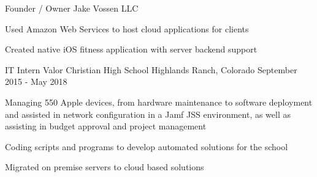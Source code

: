 \begin{cventries}
  \cventry
    {Founder / Owner}
    {Jake Vossen LLC} %
    {} %
    {}
    {
      \begin{cvitems} %
        \item {Used Amazon Web Services to host cloud applications for clients}
        \item {Created native iOS fitness application with server backend support}        
      \end{cvitems}
    }

  \cventry
    {IT Intern}
    {Valor Christian High School }
    {Highlands Ranch, Colorado} %
    {September 2015 - May 2018} %
    {
      \begin{cvitems} %
        \item {Managing 550 Apple devices, from hardware maintenance
            to software deployment and assisted in network
            configuration in a Jamf JSS environment, as well as
            assisting in budget approval and project management}
        \item {Coding scripts and programs to develop automated
            solutions for the school}
        \item {Migrated on premise servers to cloud based solutions}
      \end{cvitems}
    }
\end{cventries}
